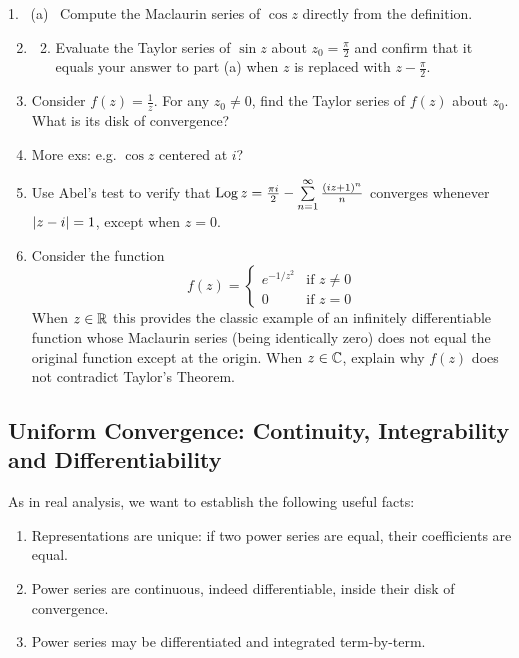\begin{exercises}
	\hangindent\doubleind
	\textup{1.} \ (a) \ Compute the Maclaurin series of $\cos z$ directly from the definition.
	\begin{enumerate}\setcounter{enumi}{1}
	  \item[]\begin{enumerate}\setcounter{enumii}{1}
	    \item Evaluate the Taylor series of $\sin z$ about $z_0=\frac\pi 2$ and confirm that it equals your answer to part (a) when $z$ is replaced with $z-\frac\pi 2$.
	  \end{enumerate} 
	  
	  \item Consider $f(z)=\frac 1z$. For any $z_0\neq 0$, find the Taylor series of $f(z)$ about $z_0$. What is its disk of convergence?
	  
	  
	  \item More exs: e.g. $\cos z$ centered at $i$?
	  
	  
	  \item\label{exs:abel2} Use Abel's test to verify that $\operatorname{Log} z=\frac{\pi i}2-\sum\limits_{n=1}^\infty \frac{(iz+1)^n}n$ converges whenever $\left| z-i\right|=1$, except when $z=0$.

	    
	  \item\label{ex:maczero} Consider the function
	  \[f(z)=\begin{cases}
	  e^{-1/z^2}&\text{if }z\neq 0\\
	  0&\text{if }z=0
	  \end{cases}\]
	  When $z\in\mathbb{R}$ this provides the classic example of an infinitely differentiable function whose Maclaurin series (being identically zero) does not equal the original function except at the origin. When $z\in\mathbb{C}$, explain why $f(z)$ does not contradict Taylor's Theorem.
	  
	\end{enumerate}
\end{exercises}
\clearpage



\subsection{Uniform Convergence: Continuity, Integrability and Differentiability}\label{sec:unifconv}

As in real analysis, we want to establish the following useful facts:
\begin{enumerate}
  \item Representations are unique: if two power series are equal, their coefficients are equal.
  \item Power series are continuous, indeed differentiable, inside their disk of convergence.
  \item Power series may be differentiated and integrated term-by-term.
\end{enumerate}


